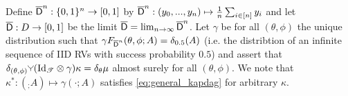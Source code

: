 Define $\overline{\mathsf{D}}^n:\{0,1\}^n\to [0,1]$ by $\overline{\mathsf{D}}^n:(y_0,...,y_n)\mapsto \frac{1}{n} \sum_{i\in [n]} y_i$ and let $\overline{\mathsf{D}}:D\to [0,1]$ be the limit $\overline{\mathsf{D}}=\lim_{n\to\infty} \overline{\mathsf{D}}^n$. Let $\gamma$ be for all $(\theta,\phi)$ the unique distribution such that $\gamma F_{\overline{\mathsf{D}}^n} (\theta,\phi;A) = \delta_{0.5}(A)$ (i.e. the distribtion of an infinite sequence of IID RVs with success probability $0.5$) and assert that  $\delta_{(\theta,\phi)} \splitter{0.1}(\text{Id}_{\mathscr{T}}\otimes \gamma)\kappa = \delta_\theta \mu$ almost surely for all $(\theta,\phi)$.  We note that $\kappa^*:(_;A)\mapsto \gamma(\cdot;A)$ satisfies \ref{eq:general_kapdag} for arbitrary $\kappa$.






